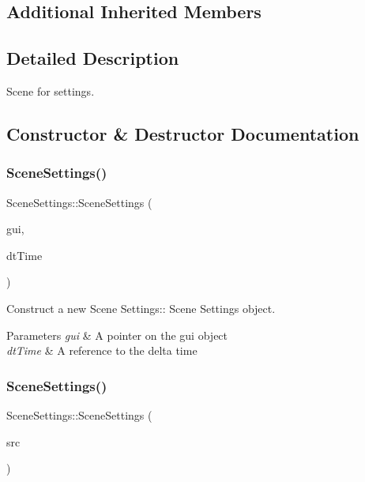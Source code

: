\subsection*{Additional Inherited Members}


\subsection{Detailed Description}
Scene for settings. 

\subsection{Constructor \& Destructor Documentation}
\mbox{\label{class_scene_settings_a92c62a92d2476e1edbd3acaba5855d2e}} 
\subsubsection{\texorpdfstring{Scene\+Settings()}{SceneSettings()}\hspace{0.1cm}{\footnotesize\ttfamily [1/2]}}
{\footnotesize\ttfamily Scene\+Settings\+::\+Scene\+Settings (\begin{DoxyParamCaption}\item[{\hyperlink{class_gui}{Gui} $\ast$}]{gui,  }\item[{float const \&}]{dt\+Time }\end{DoxyParamCaption})\hspace{0.3cm}{\ttfamily [explicit]}}



Construct a new Scene Settings\+:\+: Scene Settings object. 


\begin{DoxyParams}{Parameters}
{\em gui} & A pointer on the gui object \\
\hline
{\em dt\+Time} & A reference to the delta time \\
\hline
\end{DoxyParams}
\mbox{\label{class_scene_settings_aa7091a9a5c7a797ebdff690a38fcc2ca}} 
\subsubsection{\texorpdfstring{Scene\+Settings()}{SceneSettings()}\hspace{0.1cm}{\footnotesize\ttfamily [2/2]}}
{\footnotesize\ttfamily Scene\+Settings\+::\+Scene\+Settings (\begin{DoxyParamCaption}\item[{\hyperlink{class_scene_settings}{Scene\+Settings} const \&}]{src }\end{DoxyParamCaption})}



